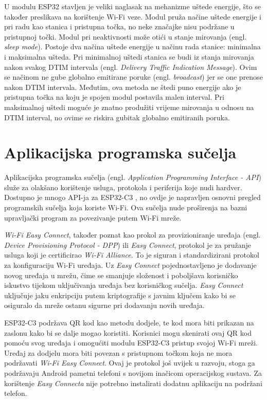 U modulu ESP32 stavljen je veliki naglasak na mehanizme uštede energije, što se također preslikava na korištenje Wi-Fi veze. Modul pruža načine uštede energije i pri radu kao stanica i pristupna točka, no neke značajke nisu podržane u pristupnoj točki. Modul pri neaktivnosti može otići u stanje mirovanja (engl. \textit{sleep mode}). Postoje dva načina uštede energije u načinu rada stanice: minimalna i maksimalna ušteda. Pri minimalnoj uštedi stanica se budi iz stanja mirovanja nakon svakog DTIM intervala (engl. \textit{Delivery Traffic Indication Message}). Ovim se načinom ne gube globalno emitirane poruke (engl. \textit{broadcast}) jer se one prenose nakon DTIM intervala. Međutim, ova metoda ne štedi puno energije ako je pristupna točka na koju je spojen modul postavila malen interval. Pri maksimalnoj uštedi moguće je znatno produžiti vrijeme mirovanja u odnosu na DTIM interval, no ovime se riskira gubitak globalno emitiranih poruka. 

\section{Aplikacijska programska sučelja}

Aplikacijska programska sučelja (engl. \textit{Application Programming Interface - API}) služe za olakšano korištenje usluga, protokola i periferija koje nudi hardver. Dostupno je mnogo API-ja za ESP32-C3 \cite{espressif}, no ovdje je napravljen osnovni pregled programskih sučelja koja koriste Wi-Fi. Ova sučelja nude proširenja na bazni upravljački program za povezivanje putem Wi-Fi mreže.

\textit{Wi-Fi Easy Connect}, također poznat kao prokol za provizioniranje uređaja (engl. \textit{Device Provisioning Protocol - DPP}) ili \textit{Easy Connect}, protokol je za pružanje usluga koji je certificirao \textit{Wi-Fi Alliance}. To je siguran i standardizirani protokol za konfiguraciju Wi-Fi uređaja. Uz \textit{Easy Connect} pojednostavljeno je dodavanje novog uređaja u mrežu, čime se smanjuje složenost i poboljšava korisničko iskustvo tijekom uključivanja uređaja bez korisničkog sučelja. \textit{Easy Connect} uključuje jaku enkripciju putem kriptografije s javnim ključem kako bi se osiguralo da mreže ostanu sigurne pri dodavanju novih uređaja.

ESP32-C3 podržava QR kod kao metodu dodjele, te kod mora biti prikazan na zaslonu kako bi se dalje mogao koristiti. Korisnici mogu skenirati ovaj QR kod pomoću svog uređaja i omogućiti modulu ESP32-C3 pristup svojoj Wi-Fi mreži. Uređaj za dodjelu mora biti povezan s pristupnom točkom koja ne mora podržavati \textit{Wi-Fi Easy Connect}. Ovaj je protokol još uvijek u razvoju, stoga ga podržavaju Android pametni telefoni s novijom inačicom operacijskog sustava. Za korištenje \textit{Easy Connecta} nije potrebno instalirati dodatnu aplikaciju na podržani telefon. 

